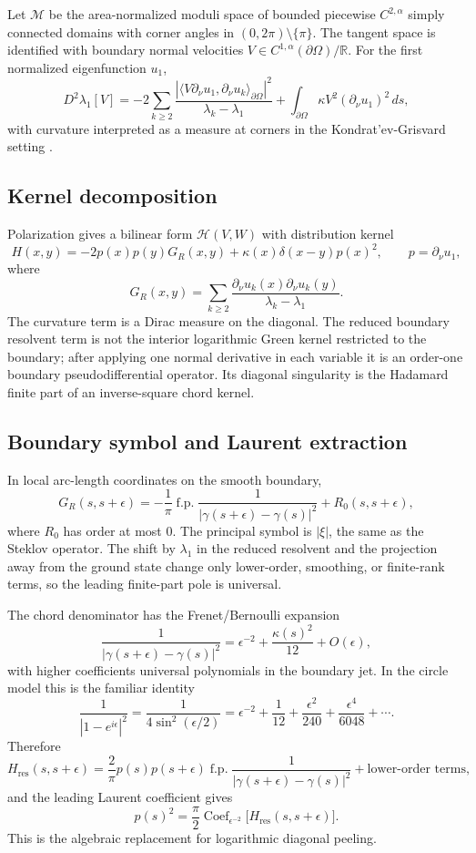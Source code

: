 \documentclass[11pt,reqno]{amsart}
\theoremstyle{plain}
\theoremstyle{definition}
\theoremstyle{remark}
\newcommand{\Reals}{\mathbb{R}}
\newcommand{\Mcal}{\mathcal{M}}
\newcommand{\Hcal}{\mathcal{H}}
\begin{document}
Let $\Mcal$ be the area-normalized moduli space of bounded piecewise $C^{2,\alpha}$ simply connected domains with corner angles in $(0,2\pi)\setminus\{\pi\}$. The tangent space is identified with boundary normal velocities $V\in C^{1,\alpha}(\partial\Omega)/\Reals$. For the first normalized eigenfunction $u_1$,
\[
D^2\lambda_1[V]
=-2\sum_{k\geq2}
\frac{|\langle V\partial_\nu u_1,\partial_\nu u_k\rangle_{\partial\Omega}|^2}{\lambda_k-\lambda_1}
+\int_{\partial\Omega}\kappa V^2(\partial_\nu u_1)^2\,ds,
\]
with curvature interpreted as a measure at corners in the Kondrat'ev-Grisvard setting \cite{Kondratev, GrisvardCorners}.

\subsection{Kernel decomposition}\label{app:ss-had-kernel}

Polarization gives a bilinear form $\Hcal(V,W)$ with distribution kernel
\[
H(x,y)=
-2p(x)p(y)G_R(x,y)
+\kappa(x)\delta(x-y)p(x)^2,
\qquad
p=\partial_\nu u_1,
\]
where
\[
G_R(x,y)=\sum_{k\geq2}
\frac{\partial_\nu u_k(x)\partial_\nu u_k(y)}{\lambda_k-\lambda_1}.
\]
The curvature term is a Dirac measure on the diagonal. The reduced boundary resolvent term is not the interior logarithmic Green kernel restricted to the boundary; after applying one normal derivative in each variable it is an order-one boundary pseudodifferential operator. Its diagonal singularity is the Hadamard finite part of an inverse-square chord kernel.

\subsection{Boundary symbol and Laurent extraction}\label{app:ss-had-symbol}

In local arc-length coordinates on the smooth boundary,
\[
G_R(s,s+\epsilon)
=-\frac{1}{\pi}\operatorname{f.p.}
\frac{1}{|\gamma(s+\epsilon)-\gamma(s)|^2}
+R_0(s,s+\epsilon),
\]
where $R_0$ has order at most $0$. The principal symbol is $|\xi|$, the same as the Steklov operator. The shift by $\lambda_1$ in the reduced resolvent and the projection away from the ground state change only lower-order, smoothing, or finite-rank terms, so the leading finite-part pole is universal.

The chord denominator has the Frenet/Bernoulli expansion
\[
\frac{1}{|\gamma(s+\epsilon)-\gamma(s)|^2}
=\epsilon^{-2}+\frac{\kappa(s)^2}{12}+O(\epsilon),
\]
with higher coefficients universal polynomials in the boundary jet. In the circle model this is the familiar identity
\[
\frac{1}{|1-e^{i\epsilon}|^2}
=\frac{1}{4\sin^2(\epsilon/2)}
=\epsilon^{-2}+\frac{1}{12}+\frac{\epsilon^2}{240}
+\frac{\epsilon^4}{6048}+\cdots.
\]
Therefore
\[
H_{\mathrm{res}}(s,s+\epsilon)
=\frac{2}{\pi}p(s)p(s+\epsilon)
\operatorname{f.p.}\frac{1}{|\gamma(s+\epsilon)-\gamma(s)|^2}
+\text{lower-order terms},
\]
and the leading Laurent coefficient gives
\[
p(s)^2
=\frac{\pi}{2}\operatorname{Coef}_{\epsilon^{-2}}
\bigl[H_{\mathrm{res}}(s,s+\epsilon)\bigr].
\]
This is the algebraic replacement for logarithmic diagonal peeling.
\end{document}
